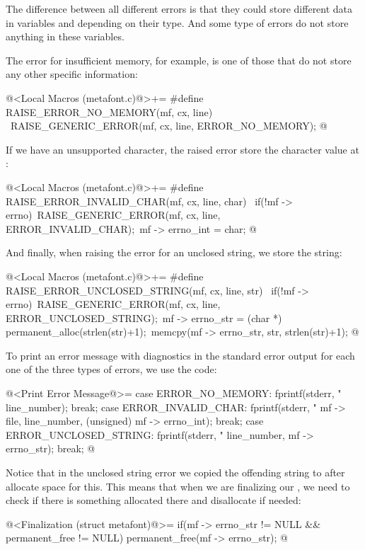 The difference between all different errors is that they could store
different data in variables 
and  depending on their type. And some type of
errors do not store anything in these variables.

The error for insufficient memory, for example, is one of those that
do not store any other specific information:

\iniciocodigo
@<Local Macros (metafont.c)@>+=
#define RAISE_ERROR_NO_MEMORY(mf, cx, line) {\
  RAISE_GENERIC_ERROR(mf, cx, line, ERROR_NO_MEMORY);}
@
\fimcodigo

If we have an unsupported character, the raised error store the
character value at :

\iniciocodigo
@<Local Macros (metafont.c)@>+=
#define RAISE_ERROR_INVALID_CHAR(mf, cx, line, char) {\
  if(!mf -> errno){\
    RAISE_GENERIC_ERROR(mf, cx, line, ERROR_INVALID_CHAR);\
    mf -> errno_int = char;}}
@
\fimcodigo

And finally, when raising the error for an unclosed string, we store
the string:

\iniciocodigo
@<Local Macros (metafont.c)@>+=
#define RAISE_ERROR_UNCLOSED_STRING(mf, cx, line, str) {\
  if(!mf -> errno){\
    RAISE_GENERIC_ERROR(mf, cx, line, ERROR_UNCLOSED_STRING);\
    mf -> errno_str = (char *) permanent_alloc(strlen(str)+1);\
    memcpy(mf -> errno_str, str, strlen(str)+1);}}
@
\fimcodigo

To print an error message with diagnostics in the standard error
output for each one of the three types of errors, we use the code:

\iniciocodigo
@<Print Error Message@>=
case ERROR_NO_MEMORY:
  fprintf(stderr, "%
          line_number);
  break;
case ERROR_INVALID_CHAR:
  fprintf(stderr, "%
          mf -> file, line_number, (unsigned) mf -> errno_int);
  break;
case ERROR_UNCLOSED_STRING:
  fprintf(stderr, "%
          line_number, mf -> errno_str);
  break;
@
\fimcodigo

Notice that in the unclosed string error we copied the offending
string to  after allocate space for this. This
means that when we are finalizing our , we
need to check if there is something allocated there and disallocate if
needed:

\iniciocodigo
@<Finalization (struct metafont)@>=
if(mf -> errno_str != NULL && permanent_free != NULL)
  permanent_free(mf -> errno_str);
@
\fimcodigo

